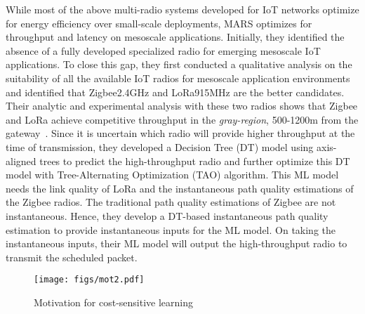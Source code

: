 While most of the above multi-radio systems developed for IoT networks optimize for energy efficiency over small-scale deployments, MARS \cite{sundaram2024mars} optimizes for throughput and latency on mesoscale applications. Initially, they identified the absence of a fully developed specialized radio for emerging mesoscale IoT applications. To close this gap, they first conducted a qualitative analysis on the suitability of all the available IoT radios for mesoscale application environments and identified that Zigbee2.4GHz and LoRa915MHz are the better candidates. Their analytic and experimental analysis with these two radios shows that Zigbee and LoRa achieve competitive throughput in the \textit{gray-region}, 500-1200m from the gateway~\cite{sundaram2024mars}. Since it is uncertain which radio will provide higher throughput at the time of transmission, they developed a Decision Tree (DT) model using axis-aligned trees to predict the high-throughput radio and further optimize this DT model with Tree-Alternating Optimization (TAO) algorithm\cite{carreira2018alternating}. This ML model needs the link quality of LoRa and the instantaneous path quality estimations of the Zigbee radios. The traditional path quality estimations of Zigbee are not instantaneous. Hence, they develop a DT-based instantaneous path quality estimation to provide instantaneous inputs for the ML model. On taking the instantaneous inputs, their ML model will output the high-throughput radio to transmit the scheduled packet.
\begin{figure}[t]
   \centering
   \texttt{[image: figs/mot2.pdf]}
        \vspace{-0.1in}
        \caption{Motivation for cost-sensitive learning}
        \label{fig:motivation}
\end{figure}
\vspace{-0.2in}